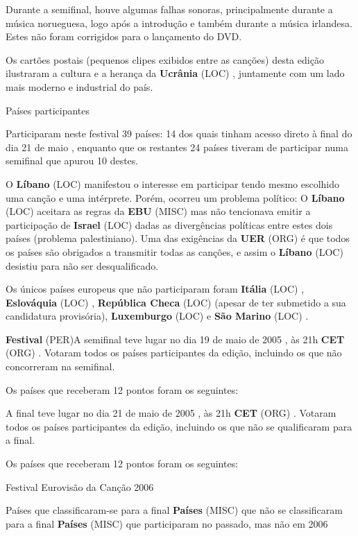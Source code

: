 \documentclass[12pt,a4paper]{article}
\begin{document}
Durante a semifinal, houve algumas falhas sonoras, principalmente durante a música norueguesa, logo após a introdução e também durante a música irlandesa. Estes não foram corrigidos para o lançamento do DVD.

Os cartões postais (pequenos clipes exibidos entre as canções) desta edição ilustraram a cultura e a herança da \textbf{Ucrânia} (LOC) , juntamente com um lado mais moderno e industrial do país.



Países participantes

Participaram neste festival 39 países: 14 dos quais tinham acesso direto à final do dia 21 de maio , enquanto que os restantes 24 países tiveram de participar numa semifinal que apurou 10 destes.

O \textbf{Líbano} (LOC) manifestou o interesse em participar tendo mesmo escolhido uma canção e uma intérprete. Porém, ocorreu um problema político: O \textbf{Líbano} (LOC) aceitara as regras da \textbf{EBU} (MISC) mas não tencionava emitir a participação de \textbf{Israel} (LOC) dadas as divergências políticas entre estes dois países (problema palestiniano). Uma das exigências da \textbf{UER} (ORG) é que todos os países são obrigados a transmitir todas as canções, e assim o \textbf{Líbano} (LOC) desistiu para não ser desqualificado.

Os únicos países europeus que não participaram foram \textbf{Itália} (LOC) , \textbf{Eslováquia} (LOC) , \textbf{República Checa} (LOC) (apesar de ter submetido a sua candidatura provisória), \textbf{Luxemburgo} (LOC) e \textbf{São Marino} (LOC) .



\textbf{Festival} (PER)A semifinal teve lugar no dia 19 de maio de 2005 , às 21h \textbf{CET} (ORG) . Votaram todos os países participantes da edição, incluindo os que não concorreram na semifinal.

Os países que receberam 12 pontos foram os seguintes:

A final teve lugar no dia 21 de maio de 2005 , às 21h \textbf{CET} (ORG) . Votaram todos os países participantes da edição, incluindo os que não se qualificaram para a final.

Os países que receberam 12 pontos foram os seguintes:



Festival Eurovisão da Canção 2006



Países que classificaram-se para a final \textbf{Países} (MISC) que não se classificaram para a final \textbf{Países} (MISC) que participaram no passado, mas não em 2006
\end{document}
